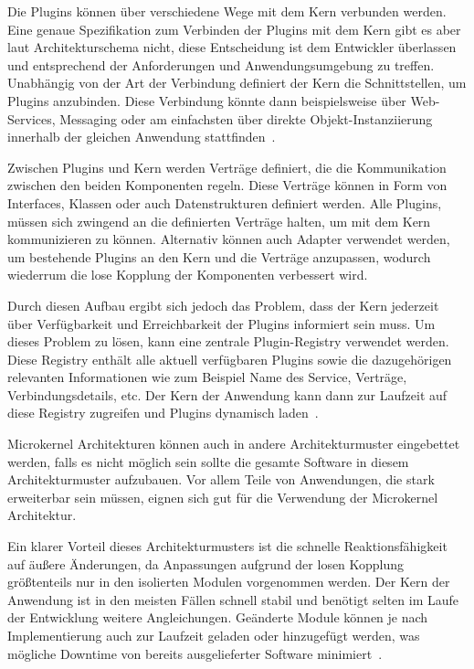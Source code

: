 \documentclass[acmtog]{acmart}
\begin{document}
Die Plugins können über verschiedene Wege mit dem Kern verbunden werden.
Eine genaue Spezifikation zum Verbinden der Plugins mit dem Kern gibt es aber laut Architekturschema nicht, diese Entscheidung ist dem Entwickler überlassen und entsprechend der Anforderungen und Anwendungsumgebung zu treffen.
Unabhängig von der Art der Verbindung definiert der Kern die Schnittstellen, um Plugins anzubinden.
Diese Verbindung könnte dann beispielsweise über Web-Services, Messaging oder am einfachsten über direkte Objekt-Instanziierung innerhalb der gleichen Anwendung stattfinden~\cite[22-23]{architecturePatterns}.

Zwischen Plugins und Kern werden Verträge definiert, die die Kommunikation zwischen den beiden Komponenten regeln.
Diese Verträge können in Form von Interfaces, Klassen oder auch Datenstrukturen definiert werden.
Alle Plugins, müssen sich zwingend an die definierten Verträge halten, um mit dem Kern kommunizieren zu können.
Alternativ können auch Adapter verwendet werden, um bestehende Plugins an den Kern und die Verträge anzupassen, wodurch wiederrum die lose Kopplung der Komponenten verbessert wird.

Durch diesen Aufbau ergibt sich jedoch das Problem, dass der Kern jederzeit über Verfügbarkeit und Erreichbarkeit der Plugins informiert sein muss.
Um dieses Problem zu lösen, kann eine zentrale Plugin-Registry verwendet werden.
Diese Registry enthält alle aktuell verfügbaren Plugins sowie die dazugehörigen relevanten Informationen wie zum Beispiel Name des Service, Verträge, Verbindungsdetails, etc.
Der Kern der Anwendung kann dann zur Laufzeit auf diese Registry zugreifen und Plugins dynamisch laden~\cite[22]{architecturePatterns}.

Microkernel Architekturen können auch in andere Architekturmuster eingebettet werden, falls es nicht möglich sein sollte die gesamte Software in diesem Architekturmuster aufzubauen.
Vor allem Teile von Anwendungen, die stark erweiterbar sein müssen, eignen sich gut für die Verwendung der Microkernel Architektur.

Ein klarer Vorteil dieses Architekturmusters ist die schnelle Reaktionsfähigkeit auf äußere Änderungen, da Anpassungen aufgrund der losen Kopplung größtenteils nur in den isolierten Modulen vorgenommen werden.
Der Kern der Anwendung ist in den meisten Fällen schnell stabil und benötigt selten im Laufe der Entwicklung weitere Angleichungen.
Geänderte Module können je nach Implementierung auch zur Laufzeit geladen oder hinzugefügt werden, was mögliche Downtime von bereits ausgelieferter Software minimiert~\cite[25]{architecturePatterns}.
\end{document}
